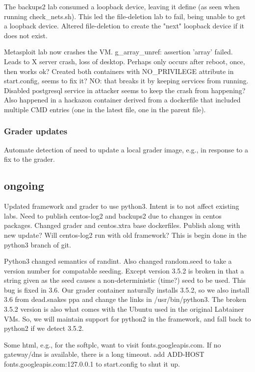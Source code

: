 \documentclass[12pt]{article}
\begin{document}
The backups2 lab consumed a loopback device, leaving it define (as seen when running check\_nets.sh).  This
led the file-deletion lab to fail, being unable to get a loopback device.  Altered file-deletion to create the
"next" loopback device if it does not exist.

Metasploit lab now crashes the VM.  g\_array\_unref: assertion 'array' failed.   Leads to X server crash, loss of
desktop.  Perhaps only occurs after reboot, once, then works ok?  Created both containers with NO\_PRIVILEGE attribute
in start.config, seems to fix it?  NO: that breaks it by keeping services from running.  Disabled postgresql service
in attacker seems to keep the crash from happening?  Also happened in a hackazon container derived from a dockerfile that
included multiple CMD entries (one in the latest file, one in the parent file).

\subsubsection{Grader updates}
Automate detection of need to update a local grader image, e.g., in response to a fix to the grader.

\subsection{ongoing}
Updated framework and grader to use python3.  Intent is to not affect existing labs.  Need to publish centos-log2 and
backups2 due to changes in centos packages.  Changed grader and centos.xtra base dockerfiles.
Publish along with new update?   Will centos-log2 run with old framework?
This is begin done in the python3 branch of git.

Python3 changed semantics of randint.  Also changed random.seed to take a version number for compatable seeding.
Except version 3.5.2 is broken in that a string given as the seed causes a non-deterministic (time?) seed to be used.
This bug is fixed in 3.6.  Our grader container naturally installs 3.5.2, so we also install 3.6 from dead.snakes ppa
and change the links in /usr/bin/python3. The broken 3.5.2 version is also what comes with the Ubuntu used in the original
Labtainer VMs.  So, we will maintain support for python2 in the framework, and fall back to python2 if we detect 3.5.2.

Some html, e.g., for the softplc, want to visit fonts.googleapis.com.  If no gateway/dns is available, there is a long timeout.
add         ADD-HOST fonts.googleapis.com:127.0.0.1 to start.config to shut it up.
\end{document}
